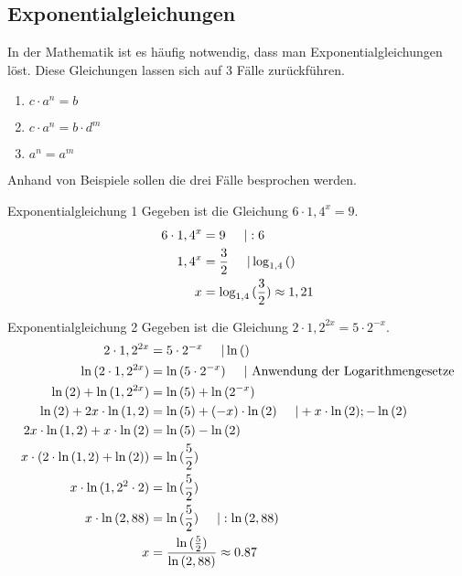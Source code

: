 \subsection{Exponentialgleichungen}
In der Mathematik ist es häufig notwendig, dass man Exponentialgleichungen löst. Diese Gleichungen lassen sich auf 3 Fälle zurückführen. 
\begin{enumerate}
    \item $c\cdot a^n = b $ 
    \item $c\cdot a^n = b\cdot d^m$
    \item $a^n=a^m$
\end{enumerate}
Anhand von Beispiele sollen die drei Fälle besprochen werden.
\begin{bsp}{Exponentialgleichung 1}{}
Gegeben ist die Gleichung $6\cdot 1,4^x = 9$.
\begin{equation*}
    \begin{split}
        6\cdot 1,4^x &= 9 \hspace{0.5cm} | : 6\\
        1,4^x&= \dfrac{3}{2} \hspace{0.5cm} | \log_{1,4}{()}\\
        x&= \log_{1,4}{(\frac{3}{2})} \approx 1,21
    \end{split}
\end{equation*}
\end{bsp}
\begin{bsp}{Exponentialgleichung 2}{}
Gegeben ist die Gleichung $2\cdot 1,2^{2x} = 5\cdot 2^{-x}$.
\begin{equation*}
    \begin{split}
        2\cdot 1,2^{2x} &= 5\cdot 2^{-x} \hspace{0.5cm} | \ln{()}\\
        \ln{(2\cdot 1,2^{2x})} &= \ln{(5\cdot 2^{-x})} \hspace{0.5cm}| \text{ Anwendung der Logarithmengesetze}\\
        \ln{(2)} + \ln{(1,2^{2x})} &= \ln{(5)} + \ln{(2^{-x})}\\
        \ln{(2)} + 2x\cdot \ln{(1,2)} &= \ln{(5)} +(-x) \cdot \ln{(2)} \hspace{0.5cm} | + x \cdot \ln{(2)}; -\ln{(2)}\\
          2x\cdot \ln{(1,2)} + x \cdot \ln{(2)} &= \ln{(5)} -\ln{(2)}\\
          x\cdot \left(2\cdot \ln{(1,2)} + \ln{(2)} \right) &= \ln{(\frac{5}{2})}\\
          x\cdot \ln{(1,2^2 \cdot 2)}&= \ln{(\frac{5}{2})}\\
           x\cdot \ln{(2,88)}&= \ln{(\frac{5}{2})}\hspace{0.5cm}| :\ln{(2,88)}\\
           x&= \dfrac{\ln{(\frac{5}{2})}}{\ln{(2,88)}} \approx 0.87
    \end{split}
\end{equation*}
\end{bsp}
